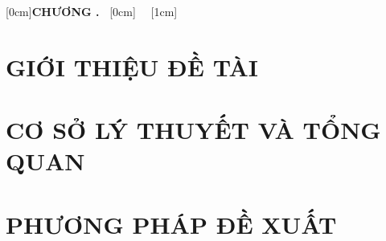 \documentclass[a4paper,oneside]{report}
\renewcommand{\_}{\textunderscore\allowbreak}
\theoremstyle{definition}
\begin{document}



\pagestyle{empty}
\clearpage
{}
\pagestyle{plain}


\clearpage


\clearpage
{}[0cm]{\bfseries\vspace{0.3cm}}{{\bfseries CHƯƠNG \thecontentslabel.\ }}{}{\contentspage}
[0cm]{\vspace{0.15cm}}{\thecontentslabel\ \ }{}{\contentspage}
[1cm]{\vspace{0.1cm}}{\thecontentslabel\ \ }{}{\contentspage}
\tableofcontents

\clearpage
{\let\oldnumberline\numberline
 \renewcommand{\numberline}{Hình~\oldnumberline}
 \listoffigures}

\clearpage
{\let\oldnumberline\numberline
 \renewcommand{\numberline}{Bảng~\oldnumberline}
 \listoftables}
\glsaddall %

\clearpage
\renewcommand*{\acronymname}{DANH MỤC TỪ VIẾT TẮT}
\renewcommand*{\entryname}{Từ viết tắt}
\renewcommand*{\descriptionname}{Ý nghĩa}
\printnoidxglossaries

\clearpage


\clearpage
{}
\pagestyle{fancy}
\fancyhf{}
\fancyhead[RO,LE]{\small\leftmark}
\fancyfoot[RO,LE]{\thepage}
\renewcommand{\chaptermark}[1]{\markboth{CHƯƠNG \thechapter. #1}{}}

\chapter{GIỚI THIỆU ĐỀ TÀI}


\chapter{CƠ SỞ LÝ THUYẾT VÀ TỔNG QUAN}


\chapter{PHƯƠNG PHÁP ĐỀ XUẤT}

\end{document}
